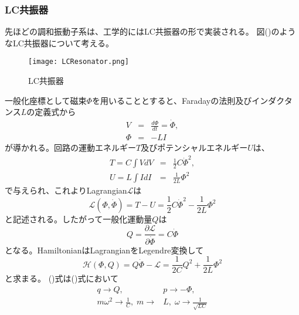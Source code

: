         \subsubsection{LC共振器}
        先ほどの調和振動子系は、工学的にはLC共振器の形で実装される。
        図()のようなLC共振器について考える。
        \begin{figure}
            \begin{center}
                \texttt{[image: LCResonator.png]}
                \caption{LC共振器}
            \end{center}
        \end{figure}
        一般化座標として磁束$\Phi$を用いることとすると、Faradayの法則及びインダクタンス$L$の定義式から
        \begin{eqnarray}
            V&=&\frac{d\Phi}{dt}=\dot{\Phi},\\
            \Phi&=&-LI
        \end{eqnarray}
        が導かれる。回路の運動エネルギー$T$及びポテンシャルエネルギー$U$は、
        \begin{eqnarray}
            T=C\int V dV & = & \frac{1}{2}C \dot{\Phi}^2,\\
            U=L\int I dI & = & \frac{1}{2L} \Phi^2
        \end{eqnarray}
        で与えられ、これよりLagrangian\quad$\mathcal{L}$は
        \begin{equation}
            \mathcal{L}(\Phi,\dot{\Phi})=T-U=\frac{1}{2}C \dot{\Phi}^2-\frac{1}{2L} \Phi^2
        \end{equation}
        と記述される。したがって一般化運動量$Q$は
        \begin{equation}
            Q = \frac{\partial\mathcal{L}}{\partial \dot{\Phi}}=C\dot{\Phi}
        \end{equation}
        となる。HamiltonianはLagrangianをLegendre変換して
        \begin{equation}
            \mathcal{H}(\Phi,Q)=Q\dot{\Phi}-\mathcal{L}=\frac{1}{2C}Q^2+\frac{1}{2L}\Phi^2
        \end{equation}
        と求まる。
        ()式は()式において
        \begin{equation}
        \begin{split}
             q \to Q,\; &p \to -\Phi,\\
             m\omega^2 \to \frac{1}{C},\; m \to &L, \; \omega \to \frac{1}{\sqrt{LC}}
        \end{split}
        \end{equation}
